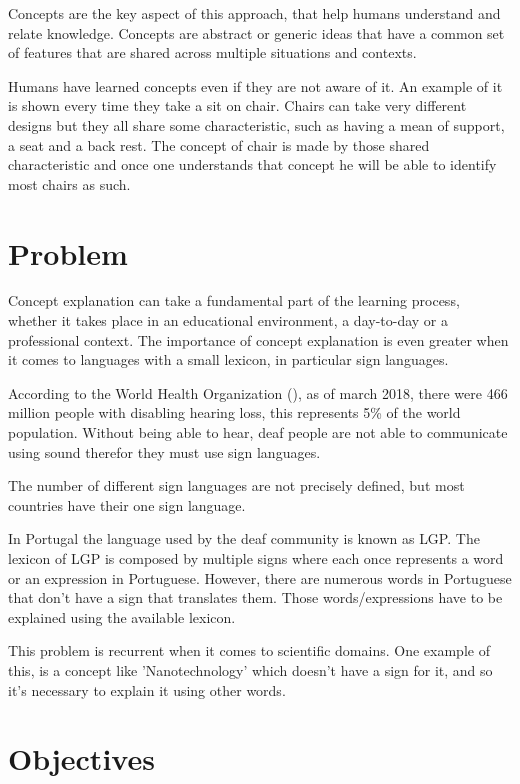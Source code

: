 Concepts are the key aspect of this approach, that help humans understand and relate knowledge.
Concepts are abstract or generic ideas that have a common set of features that are shared across multiple situations and contexts.

Humans have learned concepts even if they are not aware of it.
An example of it is shown every time they take a sit on chair.
Chairs can take very different designs but they all share some characteristic, such as having a mean of support, a seat and a back rest.
The concept of chair is made by those shared characteristic and once one understands that concept he will be able to identify most chairs as such.

\section{Problem}

Concept explanation can take a fundamental part of the learning process, whether it takes place in an educational environment, a day-to-day or a professional context.
The importance of concept explanation is even greater when it comes to languages with a small lexicon, in particular sign languages.

According to the World Health Organization (\citeyear{who_2018}), as of march 2018, there were 466 million people with disabling hearing loss, this represents 5\% of the world population.
Without being able to hear, deaf people are not able to communicate using sound therefor they must use sign languages.

The number of different sign languages are not precisely defined, but most countries have their one sign language.

In Portugal the language used by the deaf community is known as \gls{LGP}.
The lexicon of \gls{LGP} is composed by multiple signs where each once represents a word or an expression in Portuguese.
However, there are numerous words in Portuguese that don't have a sign that translates them.
Those words/expressions have to be explained using the available lexicon.

This problem is recurrent when it comes to scientific domains.
One example of this, is a concept like 'Nanotechnology' which doesn't have a sign for it, and so it's necessary to explain it using other words.

\section{Objectives}

